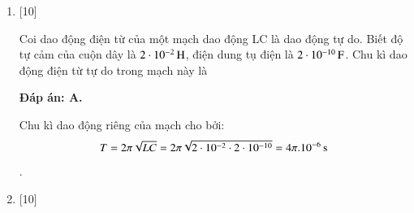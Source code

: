 \begin{enumerate}[label=\bfseries Câu \arabic*:]
	{Mạch dao động điện từ lí tưởng gồm cuộn dây thuần cảm có độ tự cảm L và tụ điện có điện dung C. Khi tăng điện dung của tụ điện lên 9 lần thì chu kì dao động riêng của mạch
	}
	
	\hideall
	{		\textbf{Đáp án: B.}
		
		Ban đầu, chu kì dao động riêng của mạch cho bởi công thức $T = 2\pi \sqrt{LC}$. \\
		Lúc sau, chu kì dao động riêng của mạch cho bởi công thức $T' = 2\pi \sqrt{LC'}$. \\
		Lập tỉ lệ hai biểu thức trên ta được $\dfrac{T'}{T} = \sqrt{\dfrac{C'}{C}}$. \\
		Thay $C' = 9C$ vào biểu thức trên ta được $T' = 3T$.
		
	}
	
	\item {} [10]
	
	{Coi dao động điện từ của một mạch dao động LC là dao động tự do. Biết độ tự cảm của cuộn dây là $\xsi{2\cdot10^{-2}}{H}$, điện dung tụ điện là $\xsi{2\cdot10^{-10}}{F}$. Chu kì dao động điện từ tự do trong mạch này là
	}
	
	\hideall
	{		\textbf{Đáp án: A.}
		
		Chu kì dao động riêng của mạch cho bởi:
		$$T = 2\pi \sqrt{LC} = 2\pi \sqrt{2\cdot10^{-2} \cdot 2\cdot10^{-10}} = \xsi{4\pi . 10^{-6}}{s}$$.
		
	}
	
	\item {} [10]
	

\end{enumerate}
